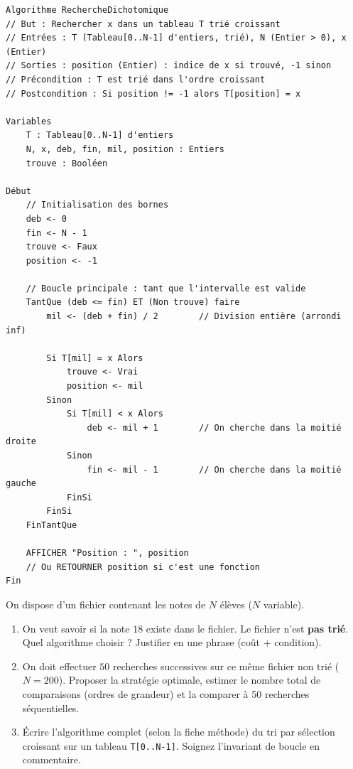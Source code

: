 \documentclass[11pt]{article}
\begin{document}
\begin{exemplebox}
\begin{lstlisting}
Algorithme RechercheDichotomique
// But : Rechercher x dans un tableau T trié croissant
// Entrées : T (Tableau[0..N-1] d'entiers, trié), N (Entier > 0), x (Entier)
// Sorties : position (Entier) : indice de x si trouvé, -1 sinon
// Précondition : T est trié dans l'ordre croissant
// Postcondition : Si position != -1 alors T[position] = x

Variables
    T : Tableau[0..N-1] d'entiers
    N, x, deb, fin, mil, position : Entiers
    trouve : Booléen

Début
    // Initialisation des bornes
    deb <- 0
    fin <- N - 1
    trouve <- Faux
    position <- -1

    // Boucle principale : tant que l'intervalle est valide
    TantQue (deb <= fin) ET (Non trouve) faire
        mil <- (deb + fin) / 2        // Division entière (arrondi inf)
        
        Si T[mil] = x Alors
            trouve <- Vrai
            position <- mil
        Sinon
            Si T[mil] < x Alors
                deb <- mil + 1        // On cherche dans la moitié droite
            Sinon
                fin <- mil - 1        // On cherche dans la moitié gauche
            FinSi
        FinSi
    FinTantQue

    AFFICHER "Position : ", position
    // Ou RETOURNER position si c'est une fonction
Fin
\end{lstlisting}
\end{exemplebox}

\begin{exercice}
On dispose d'un fichier contenant les notes de $N$ élèves ($N$ variable).
\begin{enumerate}
    \item On veut savoir si la note $18$ existe dans le fichier. Le fichier n'est \textbf{pas trié}. Quel algorithme choisir ? Justifier en une phrase (coût + condition).
    \item On doit effectuer $50$ recherches successives sur ce même fichier non trié ($N=200$). Proposer la stratégie optimale, estimer le nombre total de comparaisons (ordres de grandeur) et la comparer à 50 recherches séquentielles.
    \item Écrire l'algorithme complet (selon la fiche méthode) du tri par sélection croissant sur un tableau \texttt{T[0..N-1]}. Soignez l'invariant de boucle en commentaire.
\end{enumerate}
\end{exercice}
\end{document}
